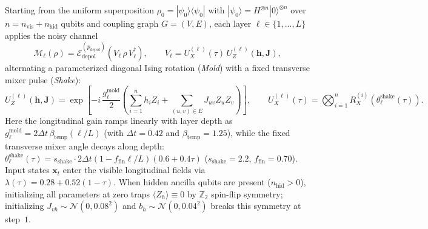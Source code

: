 \documentclass[11pt]{article}
\begin{document}
Starting from the uniform superposition $\rho_0 = |\psi_0\rangle\langle\psi_0|$ with $|\psi_0\rangle = H^{\otimes n}|0\rangle^{\otimes n}$ over $n = n_{\text{vis}}+n_{\text{hid}}$ qubits and coupling graph $G=(V,E)$, each layer $\ell \in \{1,\dots,L\}$ applies the noisy channel
\begin{equation}
  \mathcal{M}_\ell(\rho) = \mathcal{E}_{\text{depol}}^{(p_{\text{depol}})}\!\left(V_\ell\,\rho\,V_\ell^\dagger\right), \qquad V_\ell = U_X^{(\ell)}(\tau)\,U_Z^{(\ell)}(\mathbf{h},\mathbf{J}),
  \label{eq:mold_shake}
\end{equation}
alternating a parameterized diagonal Ising rotation (\emph{Mold}) with a fixed transverse mixer pulse (\emph{Shake}):
\begin{equation}
  U_Z^{(\ell)}(\mathbf{h},\mathbf{J}) = \exp\!\left[-i\,\frac{g_\ell^{\text{mold}}}{2}\!\left(\sum_{i=1}^n h_i Z_i + \sum_{(u,v)\in E} J_{uv} Z_u Z_v\right)\right], \qquad
  U_X^{(\ell)}(\tau) = \bigotimes_{i=1}^n R_X^{(i)}\!\left(\theta_\ell^{\text{shake}}(\tau)\right).
  \label{eq:uz_ux}
\end{equation}
Here the longitudinal gain ramps linearly with layer depth as $g_\ell^{\text{mold}} = 2\Delta t\,\beta_{\text{temp}}(\ell/L)$ (with $\Delta t{=}0.42$ and $\beta_{\text{temp}}{=}1.25$), while the fixed transverse mixer angle decays along depth: $\theta_\ell^{\text{shake}}(\tau) = s_{\text{shake}}\cdot 2\Delta t(1 - f_{\text{fin}}\ell/L)(0.6 + 0.4\tau)$ ($s_{\text{shake}}{=}2.2$, $f_{\text{fin}}{=}0.70$). Input states $\mathbf{x}_t$ enter the visible longitudinal fields via $\lambda(\tau) = 0.28 + 0.52(1-\tau)$. When hidden ancilla qubits are present ($n_{\text{hid}}>0$), initializing all parameters at zero traps $\langle Z_h\rangle \equiv 0$ by $\mathbb{Z}_2$ spin-flip symmetry; initializing $J_{vh}\sim\mathcal{N}(0,0.08^2)$ and $b_h\sim\mathcal{N}(0,0.04^2)$ breaks this symmetry at step~$1$.
\end{document}
